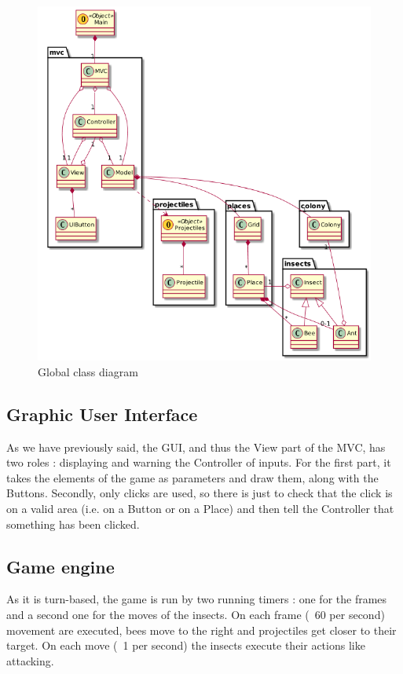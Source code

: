 \documentclass[a4paper]{article}
\begin{document}
\begin{figure}[H]
	\centering
	\includegraphics[scale=0.7]{classDiagram.png}
	\caption{Global class diagram}
	\label{classDiagram}
\end{figure}

	\subsection{Graphic User Interface}
	As we have previously said, the GUI, and thus the View part of the MVC, has two roles : displaying and warning the Controller of inputs. For the first part, it takes the elements of the game as parameters and draw them, along with the Buttons. Secondly, only clicks are used, so there is just to check that the click is on a valid area (i.e. on a Button or on a Place) and then tell the Controller that something has been clicked.
	
	\subsection{Game engine}
	As it is turn-based, the game is run by two running timers : one for the frames and a second one for the moves of the insects. On each frame (~60 per second) movement are executed, bees move to the right and projectiles get closer to their target. On each move (~1 per second) the insects execute their actions like attacking.
\end{document}
